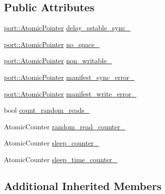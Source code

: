 \subsection*{Public Attributes}
\begin{DoxyCompactItemize}
\item 
\hyperlink{classleveldb_1_1port_1_1_atomic_pointer}{port\-::\-Atomic\-Pointer} \hyperlink{classleveldb_1_1_special_env_afa74041672c18ae40514fe461dace103}{delay\-\_\-sstable\-\_\-sync\-\_\-}
\item 
\hyperlink{classleveldb_1_1port_1_1_atomic_pointer}{port\-::\-Atomic\-Pointer} \hyperlink{classleveldb_1_1_special_env_a21c9400bf22bd43f75349677b4d3413b}{no\-\_\-space\-\_\-}
\item 
\hyperlink{classleveldb_1_1port_1_1_atomic_pointer}{port\-::\-Atomic\-Pointer} \hyperlink{classleveldb_1_1_special_env_a3ecf4339c101366198febb32cfe938f0}{non\-\_\-writable\-\_\-}
\item 
\hyperlink{classleveldb_1_1port_1_1_atomic_pointer}{port\-::\-Atomic\-Pointer} \hyperlink{classleveldb_1_1_special_env_a354d87bbdeb456c36877e506872bcc04}{manifest\-\_\-sync\-\_\-error\-\_\-}
\item 
\hyperlink{classleveldb_1_1port_1_1_atomic_pointer}{port\-::\-Atomic\-Pointer} \hyperlink{classleveldb_1_1_special_env_a7a6fafc967db1ba7594676d372b7fbec}{manifest\-\_\-write\-\_\-error\-\_\-}
\item 
bool \hyperlink{classleveldb_1_1_special_env_aaf50860248689bda9993dfdcfb53855a}{count\-\_\-random\-\_\-reads\-\_\-}
\item 
Atomic\-Counter \hyperlink{classleveldb_1_1_special_env_a7cf0b2e4dcd63460e8776ae3a2c70bee}{random\-\_\-read\-\_\-counter\-\_\-}
\item 
Atomic\-Counter \hyperlink{classleveldb_1_1_special_env_abb5c524c3a6f106ec564c09301fc7b63}{sleep\-\_\-counter\-\_\-}
\item 
Atomic\-Counter \hyperlink{classleveldb_1_1_special_env_a023eb2fe05fb56d3fb487d12ea14f904}{sleep\-\_\-time\-\_\-counter\-\_\-}
\end{DoxyCompactItemize}
\subsection*{Additional Inherited Members}


